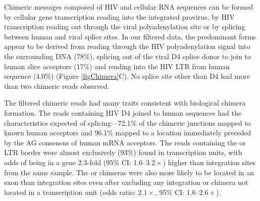 \documentclass[../sherrill-Mix_thesis.tex]{subfiles}
\begin{document}
		Chimeric messages composed of HIV and cellular RNA sequences can be formed by cellular gene transcription reading into the integrated provirus, by HIV transcription reading out through the viral polyadenylation site or by splicing between human and viral splice sites. In our filtered data, the predominant forms appear to be derived from reading through the HIV polyadenylation signal into the surrounding DNA (78\%), splicing out of the viral D4 splice donor to join to human slice acceptors (17\%) and reading into the HIV \fivePrime{} LTR from human sequence (4.0\%) (Figure \ref{figChimera}C). No splice site other than D4 had more than two chimeric reads observed. 
		
		The filtered chimeric reads had many traits consistent with biological chimera formation. The reads containing HIV D4 joined to human sequences had the characteristics expected of splicing---72.1\% of the chimeric junctions mapped to known human acceptors and 96.1\% mapped to a location immediately preceded by the AG consensus of human mRNA acceptors. The reads containing the \fivePrime{} or \threePrime{} LTR border were almost exclusively (93\%) found in transcription units, with odds of being in a gene 2.3-fold (95\% CI: 1.6--$3.2\times$) higher than integration sites from the same sample. The \fivePrime{} or \threePrime{} chimeras were also more likely to be located in an exon than integration sites even after excluding any integration or chimera not located in a transcription unit (odds ratio: $2.1\times$, 95\% CI: 1.6--$2.6\times$).

\end{document}
